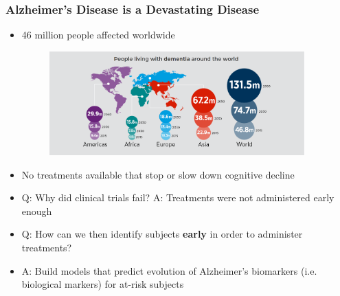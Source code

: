 \documentclass[8pt,xcolor=table,aspectratio=169]{beamer}
\begin{document}
\begin{frame}
\frametitle{Alzheimer's Disease is a Devastating Disease}

\vspace{-1em}
\begin{itemize}
 \item 46 million people affected worldwide
 
  \begin{figure}
 \centering
  \includegraphics[height=4cm]{adPrevalanceIncreasing}
 \end{figure}
 
  \item No treatments available that stop or slow down cognitive decline
  \item Q: Why did clinical trials fail? A: Treatments were not administered early enough 
 \vspace{1em}
  \item Q: How can we then identify subjects \textbf{early} in order to administer treatments? 
  \item A: Build models that predict evolution of Alzheimer's biomarkers (i.e. biological markers) for at-risk subjects
 



\end{itemize}

\vspace{-1em}

\end{frame}
\end{document}
